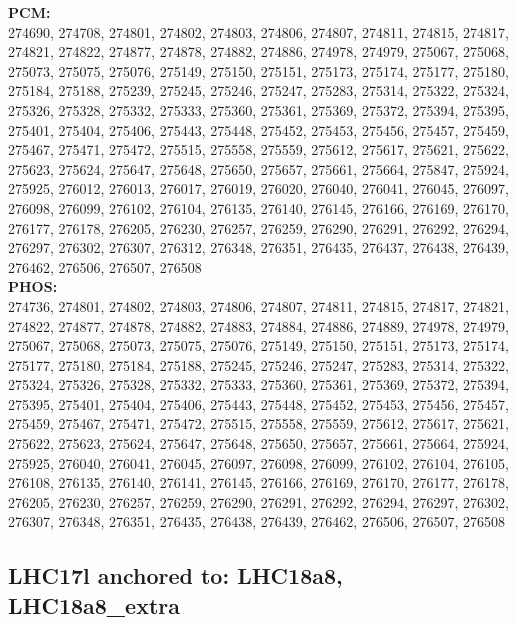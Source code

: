  \textbf{PCM:}\\
274690, 274708, 274801, 274802, 274803, 274806, 274807, 274811, 274815, 274817, 274821, 274822, 274877, 274878, 274882, 274886, 274978, 274979, 275067, 275068, 275073, 275075, 275076, 275149, 275150, 275151, 275173, 275174, 275177, 275180, 275184, 275188, 275239, 275245, 275246, 275247, 275283, 275314, 275322, 275324, 275326, 275328, 275332, 275333, 275360, 275361, 275369, 275372, 275394, 275395, 275401, 275404, 275406, 275443, 275448, 275452, 275453, 275456, 275457, 275459, 275467, 275471, 275472, 275515, 275558, 275559, 275612, 275617, 275621, 275622, 275623, 275624, 275647, 275648, 275650, 275657, 275661, 275664, 275847, 275924, 275925, 276012, 276013, 276017, 276019, 276020, 276040, 276041, 276045, 276097, 276098, 276099, 276102, 276104, 276135, 276140, 276145, 276166, 276169, 276170, 276177, 276178, 276205, 276230, 276257, 276259, 276290, 276291, 276292, 276294, 276297, 276302, 276307, 276312, 276348, 276351, 276435, 276437, 276438, 276439, 276462, 276506, 276507, 276508\\

 \textbf{PHOS:}\\
274736, 274801, 274802, 274803, 274806, 274807, 274811, 274815, 274817, 274821, 274822, 274877, 274878, 274882, 274883, 274884, 274886, 274889, 274978, 274979, 275067, 275068, 275073, 275075, 275076, 275149, 275150, 275151, 275173, 275174, 275177, 275180, 275184, 275188, 275245, 275246, 275247, 275283, 275314, 275322, 275324, 275326, 275328, 275332, 275333, 275360, 275361, 275369, 275372, 275394, 275395, 275401, 275404, 275406, 275443, 275448, 275452, 275453, 275456, 275457, 275459, 275467, 275471, 275472, 275515, 275558, 275559, 275612, 275617, 275621, 275622, 275623, 275624, 275647, 275648, 275650, 275657, 275661, 275664, 275924, 275925, 276040, 276041, 276045, 276097, 276098, 276099, 276102, 276104, 276105, 276108, 276135, 276140, 276141, 276145, 276166, 276169, 276170, 276177, 276178, 276205, 276230, 276257, 276259, 276290, 276291, 276292, 276294, 276297, 276302, 276307, 276348, 276351, 276435, 276438, 276439, 276462, 276506, 276507, 276508\\

 \subsection{LHC17l anchored to: LHC18a8, LHC18a8\_extra}

